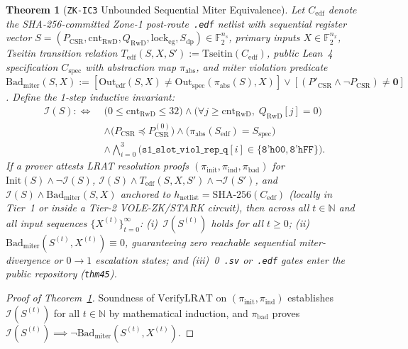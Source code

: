 \documentclass[11pt,letterpaper]{article}
\theoremstyle{spectralthm}
\newtheorem{theorem}{Theorem}[section]
\begin{document}
\begin{theorem}[\texttt{ZK-IC3} Unbounded Sequential Miter Equivalence]
\label{thm:zk_ic3}
Let $C_{\mathrm{edf}}$ denote the SHA-256-committed Zone-1 post-route~\texttt{.edf} netlist with sequential register vector $S = (P_{\mathrm{CSR}}, \mathrm{cnt}_{\mathrm{RwD}}, Q_{\mathrm{RwD}}, \mathrm{lock}_{\mathrm{eg}}, S_{\mathrm{dp}}) \in \mathbb{F}_2^{n_s}$, primary inputs $X \in \mathbb{F}_2^{n_x}$, Tseitin transition relation $T_{\mathrm{edf}}(S,X,S') := \mathrm{Tseitin}(C_{\mathrm{edf}})$, public Lean~4 specification $C_{\mathrm{spec}}$ with abstraction map $\pi_{\mathrm{abs}}$, and miter violation predicate $\mathrm{Bad}_{\mathrm{miter}}(S,X) := [\mathrm{Out}_{\mathrm{edf}}(S,X) \neq \mathrm{Out}_{\mathrm{spec}}(\pi_{\mathrm{abs}}(S),X)] \vee [(P'_{\mathrm{CSR}} \wedge \neg P_{\mathrm{CSR}}) \neq \mathbf{0}]$. Define the 1-step inductive invariant:
\begin{equation}
\label{eq:ic3_invariant}
\begin{aligned}
\mathcal{I}(S) :\iff\;& \bigl(0 \le \mathrm{cnt}_{\mathrm{RwD}} \le 32\bigr)
\wedge \bigl(\forall j \ge \mathrm{cnt}_{\mathrm{RwD}},\; Q_{\mathrm{RwD}}[j] = 0\bigr)\\
&\wedge \bigl(P_{\mathrm{CSR}} \preceq P_{\mathrm{CSR}}^{(0)}\bigr)
\wedge \bigl(\pi_{\mathrm{abs}}(S_{\mathrm{edf}}) = S_{\mathrm{spec}}\bigr)\\
&\wedge \bigwedge_{i=0}^3 \bigl(\texttt{s1\_slot\_viol\_rep\_q}[i] \in \{\texttt{8'h00}, \texttt{8'hFF}\}\bigr).
\end{aligned}
\end{equation}
If a prover attests LRAT resolution proofs $(\pi_{\mathrm{init}}, \pi_{\mathrm{ind}}, \pi_{\mathrm{bad}})$ for $\mathrm{Init}(S) \wedge \neg\mathcal{I}(S)$, $\mathcal{I}(S) \wedge T_{\mathrm{edf}}(S,X,S') \wedge \neg\mathcal{I}(S')$, and $\mathcal{I}(S) \wedge \mathrm{Bad}_{\mathrm{miter}}(S,X)$ anchored to $h_{\mathrm{netlist}} = \mathrm{SHA\text{-}256}(C_{\mathrm{edf}})$ (locally in Tier~1 or inside a Tier-2 VOLE-ZK/STARK circuit), then across all $t \in \mathbb{N}$ and all input sequences $\{X^{(t)}\}_{t=0}^{\infty}$: (i)~$\mathcal{I}(S^{(t)})$ holds for all $t \ge 0$; (ii)~$\mathrm{Bad}_{\mathrm{miter}}(S^{(t)}, X^{(t)}) \equiv 0$, guaranteeing zero reachable sequential miter-divergence or $0 \rightarrow 1$ escalation states; and (iii)~0~\texttt{.sv} or~\texttt{.edf} gates enter the public repository (\texttt{thm45}).
\end{theorem}
\begin{proof}[Proof of Theorem~\ref{thm:zk_ic3}]
Soundness of $\mathrm{VerifyLRAT}$ on $(\pi_{\mathrm{init}}, \pi_{\mathrm{ind}})$ establishes $\mathcal{I}(S^{(t)})$ for all $t \in \mathbb{N}$ by mathematical induction, and $\pi_{\mathrm{bad}}$ proves $\mathcal{I}(S^{(t)}) \implies \neg\mathrm{Bad}_{\mathrm{miter}}(S^{(t)}, X^{(t)})$.
\end{proof}
\end{document}
